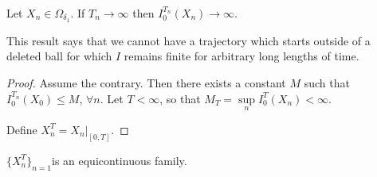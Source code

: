 \begin{lemma*}
Let $X_{n}\in \Omega_{\delta_{1}}$. If $T_{n}\to \infty$ then
$I^{T_{n}}_{0}(X_{n})\to \infty$.
\end{lemma*}

This result says that we cannot have a trajectory which starts outside
of a deleted ball for which $I$ remains finite for arbitrary long
lengths of time.

\begin{proof}
Assume the contrary. Then there exists a constant $M$ such that
$I^{T_{n}}_{0}(X_{0})\leq M$, $\forall n$. Let $T<\infty$, so that
$M_{T}=\sup\limits_{n}I^{T}_{0}(X_{n})<\infty$. 

Define $X^{T}_{n}=X_{n}|_{[0,T]}$.
\end{proof}

\begin{claim*}
$\{X^{T}_{n}\}_{n=1}$\pageoriginale is an equicontinuous family.
\end{claim*}

